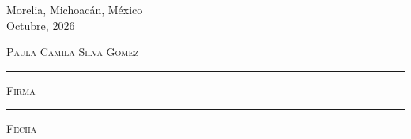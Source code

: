 \documentclass[11pt]{book}
\begin{document}
\begin{titlepage}
\begin{center}
\vfill

\begin{center}
{Morelia, Michoacán, México}\\
{Octubre, 2026}
\end{center}

\end{center}
\end{titlepage}


\thispagestyle{empty}
\vspace*{\fill}
\begingroup

\centering

\hspace{5em}

\textsc{Paula Camila Silva Gomez}

\vspace{5em}

\rule[1em]{20em}{0.5pt} %

\textsc{Firma}
 
\vspace{5em}

\rule[1em]{20em}{0.5pt} %

\textsc{Fecha}

\endgroup
\vspace*{\fill}




\end{document}
